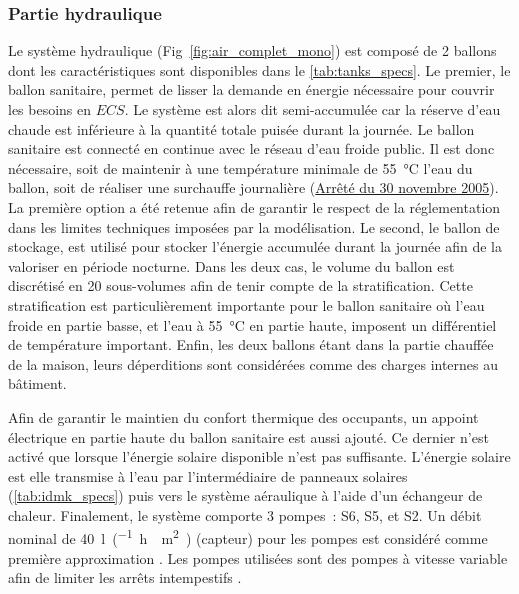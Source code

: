 \subsubsection{Partie hydraulique} %
\label{ssub:partie_hyraulique}
Le système hydraulique (Fig~\ref{fig:air_complet_mono}) est composé de 2 ballons dont les
caractéristiques sont disponibles dans le \autoref{tab:tanks_specs}. Le premier, le ballon
sanitaire, permet de lisser la demande en énergie nécessaire pour couvrir les besoins en
$ECS$. Le système est alors dit semi-accumulée car la réserve d’eau chaude est inférieure
à la quantité totale puisée durant la journée. Le ballon sanitaire est connecté en
continue avec le réseau d’eau froide public. Il est donc nécessaire, soit de maintenir
à une température minimale de \SI{55}{\celsius} l’eau du ballon, soit de réaliser une surchauffe journalière
(\href{https://www.legifrance.gouv.fr/affichTexte.do?cidTexte=JORFTEXT000000423756}{Arrêté
du 30 novembre 2005}). La première option a été retenue afin de garantir le respect de la
réglementation dans les limites techniques imposées par la modélisation. Le second, le
ballon de stockage, est utilisé pour stocker l’énergie accumulée durant la journée afin de
la valoriser en période nocturne. Dans les deux cas, le volume du ballon est discrétisé en
\num{20} sous-volumes afin de tenir compte de la stratification. Cette stratification est
particulièrement importante pour le ballon sanitaire où l’eau froide en partie basse, et
l’eau à \SI{55}{\celsius} en partie haute, imposent un différentiel de température
important. Enfin, les deux ballons étant dans la partie chauffée de la maison, leurs
déperditions sont considérées comme des charges internes au bâtiment.

Afin de garantir le maintien du confort thermique des occupants, un appoint électrique en
partie haute du ballon sanitaire est aussi ajouté. Ce dernier n’est activé que lorsque
l’énergie solaire disponible n’est pas suffisante. L’énergie solaire est elle transmise à
l’eau par l’intermédiaire de panneaux solaires (\autoref{tab:idmk_specs}) puis vers le
système aéraulique à l’aide d’un échangeur de chaleur. Finalement, le système comporte 3
pompes~: S6, S5, et S2. Un débit nominal de \SI{40}{\litre\per(\hour\period\meter\squared)}
(capteur) pour les pompes est considéré comme première approximation
\parencite{Peuser2005}. Les pompes utilisées sont des pompes à vitesse variable afin de
limiter les arrêts intempestifs \parencite{Kicsiny20123489}.

